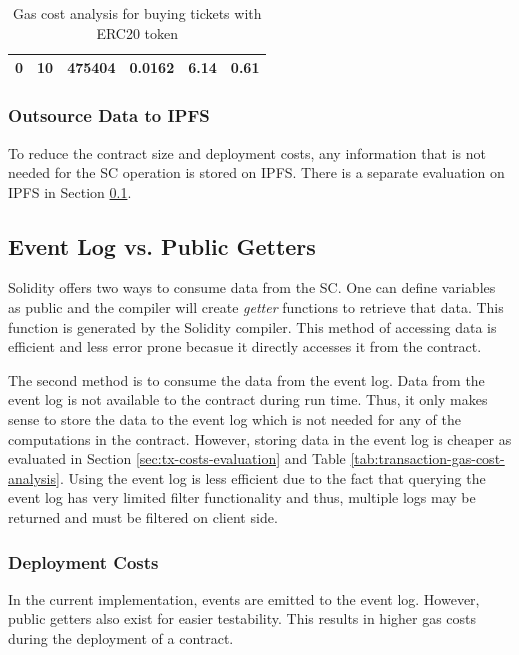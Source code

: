 \begin{table}[ht]
\begin{tabular}{|c|c|c|c|c|c|}
{ 0}                                                                     & { 10}                                                                & { 475404}                                                       & { 0.0162}                                                        & { 6.14}                                                          & { 0.61}                                                                          \\ \hline
\end{tabular}
\caption{Gas cost analysis for buying tickets with ERC20 token}
\label{tab:gas-cost-buying-ticket-types-with-erc20}
\end{table}


\subsubsection{Outsource Data to IPFS}
To reduce the contract size and deployment costs, any information that is not needed for the SC operation is stored on IPFS. There is a separate evaluation on IPFS in Section \ref{subsection:event-log-vs-public-getters}.

\subsection{Event Log vs. Public Getters}\label{subsection:event-log-vs-public-getters}
Solidity offers two ways to consume data from the SC. One can define variables as public and the compiler will create \textit{getter} functions to retrieve that data. This function is generated by the Solidity compiler. This method of accessing data is efficient and less error prone becasue it directly accesses it from the contract. 

The second method is to consume the data from the event log. Data from the event log is not available to the contract during run time. Thus, it only makes sense to store the data to the event log which is not needed for any of the computations in the contract. However, storing data in the event log is cheaper as evaluated in Section \ref{sec:tx-costs-evaluation} and Table \ref{tab:transaction-gas-cost-analysis}. Using the event log is less efficient due to the fact that querying the event log has very limited filter functionality and thus, multiple logs may be returned and must be filtered on client side. 

\subsubsection{Deployment Costs}
In the current implementation, events are emitted to the event log. However, public getters also exist for easier testability. This results in higher gas costs during the deployment of a contract.

